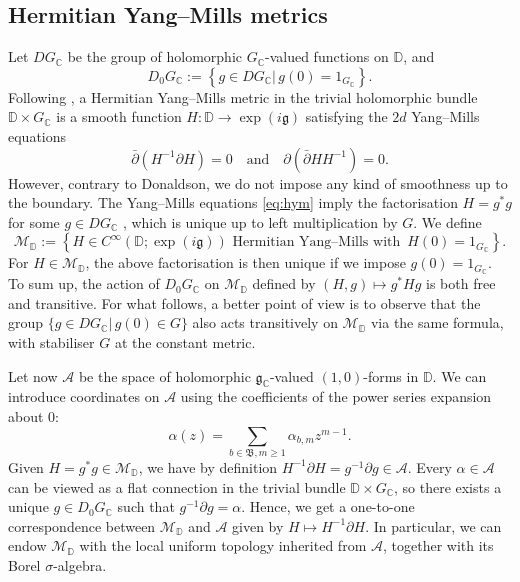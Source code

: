 \documentclass[12pt,a4paper]{amsart}
\numberwithin{equation}{section}
\theoremstyle{remark}
\theoremstyle{definition}
\newcommand{\kg}{\mathfrak g}
\newcommand{\C}{\mathbb C}
\newcommand{\D}{\mathbb D}
\newcommand{\cA}{\mathcal A}
\newcommand{\kB}{\mathfrak B}
\newcommand{\del}{\partial}
\newcommand{\delbar}{\bar\partial}
\newcommand{\cM}{\mathcal M}
\newcommand{\qand}{\quad\text{and}\quad}
\begin{document}
    \subsection{Hermitian Yang--Mills metrics}\label{subsec:HYM}
Let $DG_\C$ be the group of holomorphic $G_\C$-valued functions on $\D$, and 
\[D_0G_\C:=\left\lbrace g\in DG_\C|\,g(0)=1_{G_\C}\right\rbrace.\]
Following \cite{Donaldson}, a Hermitian Yang--Mills metric in the trivial holomorphic bundle $\D\times G_\C$ is a smooth function $H:\D\to\exp(i\kg)$ satisfying the $2d$ Yang--Mills equations
\begin{equation}\label{eq:hym}
\delbar(H^{-1}\del H)=0\qand\del(\delbar HH^{-1})=0.
\end{equation}
However, contrary to Donaldson, we do not impose any kind of smoothness up to the boundary. The Yang--Mills equations \eqref{eq:hym} imply the factorisation $H=g^*g$ for some $g\in DG_\C$ \cite[Section 3.3]{Donaldson}, which is unique up to left multiplication by $G$. We define
\[\cM_\D:=\left\lbrace H\in C^\infty(\D;\exp(i\kg))\text{ Hermitian Yang--Mills with }\,H(0)=1_{G_\C}\right\rbrace.\]
For $H\in\cM_\D$, the above factorisation is then unique if we impose $g(0)=1_{G_\C}$. To sum up, the action of $D_0G_\C$ on $\cM_\D$ defined by $(H,g)\mapsto g^*Hg$ is both free and transitive. For what follows, a better point of view is to observe that the group $\{g\in DG_\C|\,g(0)\in G\}$ also acts transitively on $\cM_\D$ via the same formula, with stabiliser $G$ at the constant metric. %




Let now $\cA$ be the space of holomorphic $\kg_\C$-valued $(1,0)$-forms in $\D$. We can introduce coordinates on $\cA$ using the coefficients of the power series expansion about 0:
\begin{equation}\label{eq:coeffs}
\alpha(z)=\sum_{b\in\kB,m\geq1}\alpha_{b,m}z^{m-1}.
\end{equation}
Given $H=g^*g\in\cM_\D$, we have by definition $H^{-1}\del H=g^{-1}\del g\in\cA$. Every $\alpha\in\cA$ can be viewed as a flat connection in the trivial bundle $\D\times G_\C$, so there exists a unique $g\in D_0G_\C$ such that $g^{-1}\del g=\alpha$. Hence, we get a one-to-one correspondence between $\cM_\D$ and $\cA$ given by $H\mapsto H^{-1}\del H$. In particular, we can endow $\cM_\D$ with the local uniform topology inherited from $\cA$, together with its Borel $\sigma$-algebra. 
\end{document}
